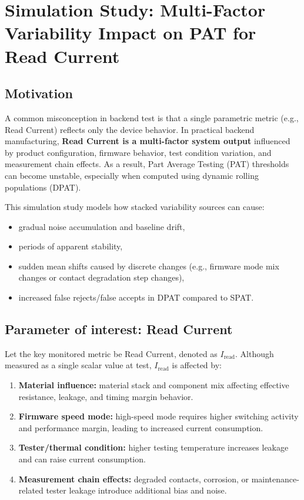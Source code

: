 \documentclass[11pt,a4paper]{article}
\begin{document}
	
	\section{Simulation Study: Multi-Factor Variability Impact on PAT for Read Current}
	
	\subsection{Motivation}
	A common misconception in backend test is that a single parametric metric (e.g., Read Current) reflects only the device behavior.
	In practical backend manufacturing, \textbf{Read Current is a multi-factor system output} influenced by product configuration,
	firmware behavior, test condition variation, and measurement chain effects. As a result, Part Average Testing (PAT) thresholds
	can become unstable, especially when computed using dynamic rolling populations (DPAT).
	
	This simulation study models how stacked variability sources can cause:
	\begin{itemize}[leftmargin=1.2em]
		\item gradual noise accumulation and baseline drift,
		\item periods of apparent stability,
		\item sudden mean shifts caused by discrete changes (e.g., firmware mode mix changes or contact degradation step changes),
		\item increased false rejects/false accepts in DPAT compared to SPAT.
	\end{itemize}
	
	\subsection{Parameter of interest: Read Current}
	Let the key monitored metric be Read Current, denoted as $I_{\text{read}}$.
	Although measured as a single scalar value at test, $I_{\text{read}}$ is affected by:
	\begin{enumerate}[leftmargin=1.2em]
		\item \textbf{Material influence:} material stack and component mix affecting effective resistance, leakage, and timing margin behavior.
		\item \textbf{Firmware speed mode:} high-speed mode requires higher switching activity and performance margin, leading to increased current consumption.
		\item \textbf{Tester/thermal condition:} higher testing temperature increases leakage and can raise current consumption.
		\item \textbf{Measurement chain effects:} degraded contacts, corrosion, or maintenance-related tester leakage introduce additional bias and noise.
	\end{enumerate}
	
\end{document}
